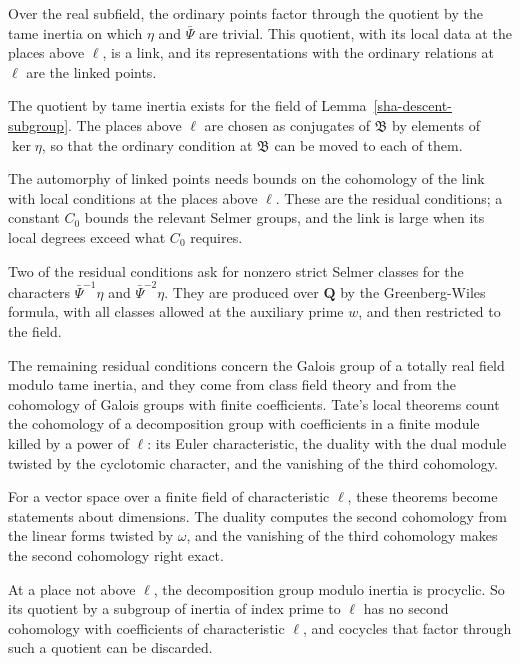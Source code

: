 Over the real subfield, the ordinary points factor through the quotient by the tame inertia on which $\eta$ and $\bar\Psi$ are trivial. This quotient, with its local data at the places above $\ell$, is a link, and its representations with the ordinary relations at $\ell$ are the linked points.

The quotient by tame inertia exists for the field of Lemma~\ref{sha-descent-subgroup}. The places above $\ell$ are chosen as conjugates of $\mathfrak B$ by elements of $\ker\eta$, so that the ordinary condition at $\mathfrak B$ can be moved to each of them.

The automorphy of linked points needs bounds on the cohomology of the link with local conditions at the places above $\ell$. These are the residual conditions; a constant $C_0$ bounds the relevant Selmer groups, and the link is large when its local degrees exceed what $C_0$ requires.

Two of the residual conditions ask for nonzero strict Selmer classes for the characters $\bar\Psi^{-1}\eta$ and $\bar\Psi^{-2}\eta$. They are produced over $\mathbf Q$ by the Greenberg-Wiles formula, with all classes allowed at the auxiliary prime $w$, and then restricted to the field.

The remaining residual conditions concern the Galois group of a totally real field modulo tame inertia, and they come from class field theory and from the cohomology of Galois groups with finite coefficients. Tate's local theorems count the cohomology of a decomposition group with coefficients in a finite module killed by a power of $\ell$: its Euler characteristic, the duality with the dual module twisted by the cyclotomic character, and the vanishing of the third cohomology.

For a vector space over a finite field of characteristic $\ell$, these theorems become statements about dimensions. The duality computes the second cohomology from the linear forms twisted by $\omega$, and the vanishing of the third cohomology makes the second cohomology right exact.

At a place not above $\ell$, the decomposition group modulo inertia is procyclic. So its quotient by a subgroup of inertia of index prime to $\ell$ has no second cohomology with coefficients of characteristic $\ell$, and cocycles that factor through such a quotient can be discarded.

